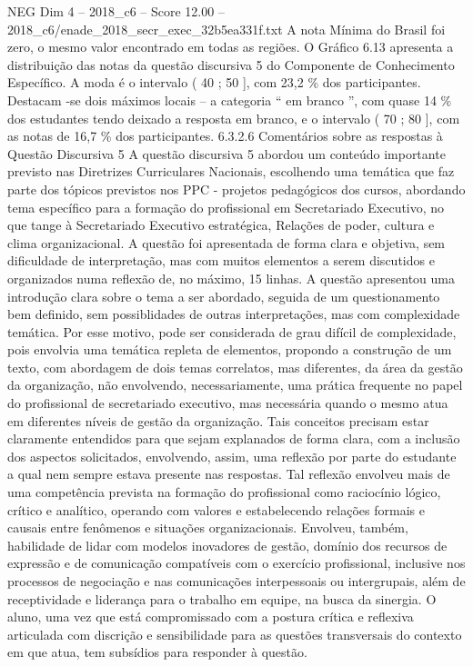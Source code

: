 \begin{textsample}{NEG Dim 4 – 2018\_c6 – Score 12.00 – 2018\_c6/enade\_2018\_secr\_exec\_32b5ea331f.txt}
A nota Mínima do Brasil foi zero, o mesmo valor encontrado em todas as regiões.
O Gráfico 6.13 apresenta a distribuição das notas da questão discursiva 5 do Componente de Conhecimento Específico.
A moda é o intervalo ( 40 ; 50 ], com 23,2 \% dos participantes.
Destacam -se dois máximos locais – a categoria “ em branco ”, com quase 14 \% dos estudantes tendo deixado a resposta em branco, e o intervalo ( 70 ; 80 ], com as notas de 16,7 \% dos participantes. 6.3.2.6 Comentários sobre as respostas à Questão Discursiva 5 A questão discursiva 5 abordou um conteúdo importante previsto nas Diretrizes Curriculares Nacionais, escolhendo uma temática que faz parte dos tópicos previstos nos PPC - projetos pedagógicos dos cursos, abordando tema específico para a formação do profissional em Secretariado Executivo, no que tange à Secretariado Executivo estratégica, Relações de poder, cultura e clima organizacional.
A questão foi apresentada de forma clara e objetiva, sem dificuldade de interpretação, mas com muitos elementos a serem discutidos e organizados numa reflexão de, no máximo, 15 linhas.
A questão apresentou uma introdução clara sobre o tema a ser abordado, seguida de um questionamento bem definido, sem possiblidades de outras interpretações, mas com complexidade temática.
Por esse motivo, pode ser considerada de grau difícil de complexidade, pois envolvia uma temática repleta de elementos, propondo a construção de um texto, com abordagem de dois temas correlatos, mas diferentes, da área da gestão da organização, não envolvendo, necessariamente, uma prática frequente no papel do profissional de secretariado executivo, mas necessária quando o mesmo atua em diferentes níveis de gestão da organização.
Tais conceitos precisam estar claramente entendidos para que sejam explanados de forma clara, com a inclusão dos aspectos solicitados, envolvendo, assim, uma reflexão por parte do estudante a qual nem sempre estava presente nas respostas.
Tal reflexão envolveu mais de uma competência prevista na formação do profissional como raciocínio lógico, crítico e analítico, operando com valores e estabelecendo relações formais e causais entre fenômenos e situações organizacionais.
Envolveu, também, habilidade de lidar com modelos inovadores de gestão, domínio dos recursos de expressão e de comunicação compatíveis com o exercício profissional, inclusive nos processos de negociação e nas comunicações interpessoais ou intergrupais, além de receptividade e liderança para o trabalho em equipe, na busca da sinergia.
O aluno, uma vez que está compromissado com a postura crítica e reflexiva articulada com discrição e sensibilidade para as questões transversais do contexto em que atua, tem subsídios para responder à questão.

\end{textsample}

